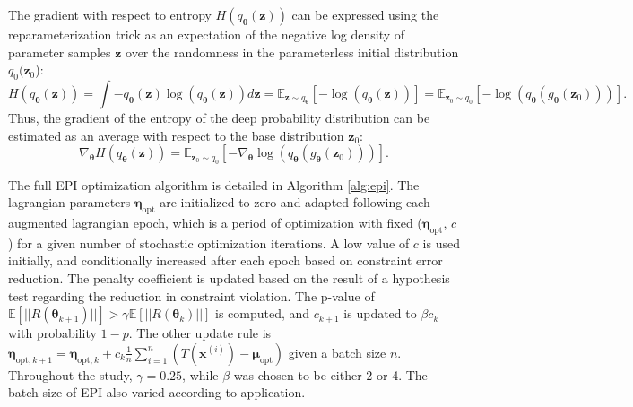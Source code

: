 \documentclass[11pt]{article}
\begin{document}
The gradient with respect to entropy $H(q_{\bm{\theta}}(\mathbf{z}))$ can be expressed using the reparameterization trick as an expectation of the negative log density of parameter samples $\mathbf{z}$ over the randomness in the parameterless initial distribution $q_0(\mathbf{z}_0$):
\begin{equation}
H(q_{\bm{\theta}}(\mathbf{z})) = \int - q_{\bm{\theta}}(\mathbf{z}) \log(q_{\bm{\theta}}(\mathbf{z})) d\mathbf{z} = \mathbb{E}_{\mathbf{z} \sim q_{\bm{\theta}}}\left[-\log(q_{\bm{\theta}}(\mathbf{z})) \right] = \mathbb{E}_{\mathbf{z}_0 \sim q_0}\left[-\log(q_{\bm{\theta}}(g_{\bm{\theta}}(\mathbf{z}_0))) \right].
\end{equation}
Thus, the gradient of the entropy of the deep probability distribution can be estimated as an average with respect to the base distribution $\mathbf{z}_0$:
\begin{equation}
\nabla_{\bm{\theta}} H(q_{\bm{\theta}}(\mathbf{z})) = \mathbb{E}_{\mathbf{z}_0 \sim q_0}\left[- \nabla_{\bm{\theta}} \log(q_{\bm{\theta}}(g_{\bm{\theta}}(\mathbf{z}_0))) \right].
\end{equation}

The full EPI optimization algorithm is detailed in Algorithm \ref{alg:epi}. The lagrangian parameters $\bm{\eta}_{\text{opt}}$ are initialized to zero and adapted following each augmented lagrangian epoch, which is a period of optimization with fixed ($\bm{\eta}_{\text{opt}}$, $c$) for a given number of stochastic optimization iterations. 
A low value of $c$ is used initially, and conditionally increased after each epoch based on constraint error reduction.
The penalty coefficient is updated based on the result of a hypothesis test regarding the reduction in constraint violation.  
The p-value of $\mathbb{E}[||R(\bm{\theta}_{k+1})||] > \gamma \mathbb{E} \left[||R(\bm{\theta}_{k})|| \right]$ is computed, and $c_{k+1}$ is updated  to $\beta c_k$ with probability $1-p$.  
The other update rule is $\bm{\eta}_{\text{opt},k+1} = \bm{\eta}_{\text{opt},k} + c_k \frac{1}{n} \sum_{i=1}^n (T(\mathbf{x}^{(i)}) - \bm{\mu}_{\text{opt}})$ given a batch size $n$.
Throughout the study, $\gamma = 0.25$, while $\beta$ was chosen to be either 2 or 4.  The batch size of EPI also varied according to application.
\end{document}
